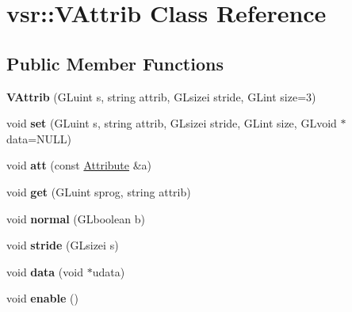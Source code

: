 \hypertarget{classvsr_1_1_v_attrib}{\section{vsr\-:\-:V\-Attrib Class Reference}
\label{classvsr_1_1_v_attrib}
}
\subsection*{Public Member Functions}
\begin{DoxyCompactItemize}
\item 
\hypertarget{classvsr_1_1_v_attrib_a325feee9aa9983fa39cc78d9ab59cf78}{{\bfseries V\-Attrib} (G\-Luint s, string attrib, G\-Lsizei stride, G\-Lint size=3)}\label{classvsr_1_1_v_attrib_a325feee9aa9983fa39cc78d9ab59cf78}

\item 
\hypertarget{classvsr_1_1_v_attrib_abab2f08fbb407ea57d273fca7d53e1da}{void {\bfseries set} (G\-Luint s, string attrib, G\-Lsizei stride, G\-Lint size, G\-Lvoid $\ast$data=N\-U\-L\-L)}\label{classvsr_1_1_v_attrib_abab2f08fbb407ea57d273fca7d53e1da}

\item 
\hypertarget{classvsr_1_1_v_attrib_aadbf30aae608be777e150b9430e82cb5}{void {\bfseries att} (const \hyperlink{structvsr_1_1_attribute}{Attribute} \&a)}\label{classvsr_1_1_v_attrib_aadbf30aae608be777e150b9430e82cb5}

\item 
\hypertarget{classvsr_1_1_v_attrib_a0fa651f8b36c09c93334082367fa7424}{void {\bfseries get} (G\-Luint sprog, string attrib)}\label{classvsr_1_1_v_attrib_a0fa651f8b36c09c93334082367fa7424}

\item 
\hypertarget{classvsr_1_1_v_attrib_a632424319d734ae290f757f3dfa66e0e}{void {\bfseries normal} (G\-Lboolean b)}\label{classvsr_1_1_v_attrib_a632424319d734ae290f757f3dfa66e0e}

\item 
\hypertarget{classvsr_1_1_v_attrib_a46b6f37c414f6b3914a7c0488f8bca0a}{void {\bfseries stride} (G\-Lsizei s)}\label{classvsr_1_1_v_attrib_a46b6f37c414f6b3914a7c0488f8bca0a}

\item 
\hypertarget{classvsr_1_1_v_attrib_aaffea96c461e9a2144299f38553b1a26}{void {\bfseries data} (void $\ast$udata)}\label{classvsr_1_1_v_attrib_aaffea96c461e9a2144299f38553b1a26}

\item 
\hypertarget{classvsr_1_1_v_attrib_abc97acc69889f6ede150dea108a2ffd1}{void {\bfseries enable} ()}\label{classvsr_1_1_v_attrib_abc97acc69889f6ede150dea108a2ffd1}


\end{DoxyCompactItemize}
